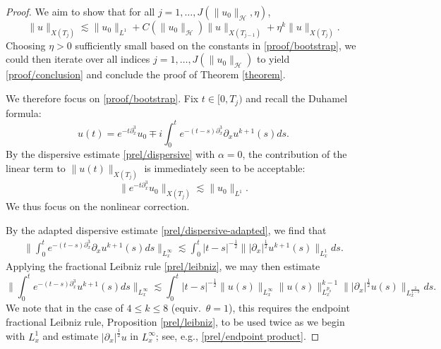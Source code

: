 \documentclass[10pt, reqno]{amsart}
\numberwithin{equation}{section}
\theoremstyle{definition}
\theoremstyle{remark}
\begin{document}
\begin{proof}
    We aim to show that for all $j = 1,\dots, J(\|u_0\|_{\mathcal{H}}, \eta)$,
    \begin{equation}\label{proof/bootstrap}
        \|u\|_{X(T_j)} \lesssim \|u_0\|_{L^1} + C(\|u_0\|_{\mathcal{H}})\|u\|_{X(T_{j-1})} + \eta^k \|u\|_{X(T_j)}.
    \end{equation}
    Choosing $\eta > 0$ sufficiently small based on the constants in \eqref{proof/bootstrap}, we could then iterate over all indices $j = 1,\dots, J(\|u_0\|_{\mathcal{H}})$ to yield \eqref{proof/conclusion} and conclude the proof of Theorem \ref{theorem}.

    We therefore focus on \eqref{proof/bootstrap}. Fix $t \in [0,T_j)$ and recall the Duhamel formula:
    \begin{equation*}
        u(t) = e^{-t\partial_x^3} u_0 \mp i \int_0^{t} e^{-(t-s)\partial_x^3}\partial_x u^{k+1}(s) ds.
    \end{equation*}
    By the dispersive estimate \eqref{prel/dispersive} with $\alpha = 0$, the contribution of the linear term to $\|u(t)\|_{X(T_j)}$ is immediately seen to be acceptable:
    \begin{equation*}
        \big\|e^{-t\partial_x^3} u_0\big\|_{X(T_j)} \lesssim \|u_0\|_{L^1}.
    \end{equation*}
    We thus focus on the nonlinear correction.

    By the adapted dispersive estimate \eqref{prel/dispersive-adapted}, we find that
    \begin{align}\label{proof/failure 0}
         \bigg\|\int_0^t e^{-(t-s)\partial^3_x}\partial_x u^{k+1}(s)ds\bigg\|_{L_x^\infty}
         \lesssim \int_0^t |t-s|^{-\frac{1}{2}}\big\||\partial_x|^{\frac{1}{2}}u^{k+1}(s)\big\|_{L_x^1}ds.
    \end{align}
    Applying the fractional Leibniz rule \eqref{prel/leibniz}, we may then estimate
    \begin{equation}\label{proof/failure 1}
         \bigg\|\int_0^t e^{-(t-s)\partial^3_x}u^{k+1}(s)ds\bigg\|_{L_x^\infty}
         \lesssim \int_0^t |t-s|^{-\frac{1}{2}}\|u(s)\|_{L_x^\infty} \|u(s)\|_{L_x^{p_\theta}}^{k-1} \big\||\partial_x|^{\frac{1}{2}}u(s)\big\|_{L_x^\frac{2}{1-\theta}}ds.
    \end{equation}
    We note that in the case of $4 \leq k \leq 8$ (equiv.~$\theta = 1$), this requires the endpoint fractional Leibniz rule, Proposition \ref{prel/leibniz}, to be used twice as we begin with $L_x^1$ and estimate $|\partial_x|^{\frac{1}{2}}u$ in $L_x^\infty$; see, e.g., \eqref{prel/endpoint product}.


\end{proof}
\end{document}
